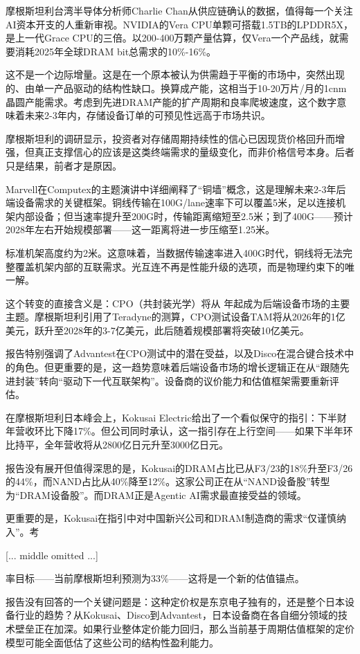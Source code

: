 \documentclass[11pt]{ctexart}
\begin{document}
摩根斯坦利台湾半导体分析师Charlie Chan从供应链确认的数据，值得每一个关注AI资本开支的人重新审视。NVIDIA的Vera CPU单颗可搭载1.5TB的LPDDR5X，是上一代Grace CPU的三倍。以200-400万颗产量估算，仅Vera一个产品线，就需要消耗2025年全球DRAM bit总需求的10\%-16\%。

这不是一个边际增量。这是在一个原本被认为供需趋于平衡的市场中，突然出现的、由单一产品驱动的结构性缺口。换算成产能，这相当于10-20万片/月的1cnm晶圆产能需求。考虑到先进DRAM产能的扩产周期和良率爬坡速度，这个数字意味着未来2-3年内，存储设备订单的可预见性远高于市场共识。

摩根斯坦利的调研显示，投资者对存储周期持续性的信心已因现货价格回升而增强，但真正支撑信心的应该是这类终端需求的量级变化，而非价格信号本身。后者只是结果，前者才是原因。

Marvell在Computex的主题演讲中详细阐释了“铜墙”概念，这是理解未来2-3年后端设备需求的关键框架。铜线传输在100G/lane速率下可以覆盖5米，足以连接机架内部设备；但当速率提升至200G时，传输距离缩短至2.5米；到了400G——预计2028年左右开始规模部署——这一距离将进一步压缩至1.25米。

标准机架高度约为2米。这意味着，当数据传输速率进入400G时代，铜线将无法完整覆盖机架内部的互联需求。光互连不再是性能升级的选项，而是物理约束下的唯一解。

这个转变的直接含义是：CPO（共封装光学）将从 年起成为后端设备市场的主要主题。摩根斯坦利引用了Teradyne的测算，CPO测试设备TAM将从2026年的1亿美元，跃升至2028年的3-7亿美元，此后随着规模部署将突破10亿美元。

报告特别强调了Advantest在CPO测试中的潜在受益，以及Disco在混合键合技术中的角色。但更重要的是，这一趋势意味着后端设备市场的增长逻辑正在从“跟随先进封装”转向“驱动下一代互联架构”。设备商的议价能力和估值框架需要重新评估。

在摩根斯坦利日本峰会上，Kokusai Electric给出了一个看似保守的指引：下半财年营收环比下降17\%。但公司同时承认，这一指引存在上行空间——如果下半年环比持平，全年营收将从2800亿日元升至3000亿日元。

报告没有展开但值得深思的是，Kokusai的DRAM占比已从F3/23的18\%升至F3/26的44\%，而NAND占比从40\%降至12\%。这家公司正在从“NAND设备股”转型为“DRAM设备股”。而DRAM正是Agentic AI需求最直接受益的领域。

更重要的是，Kokusai在指引中对中国新兴公司和DRAM制造商的需求“仅谨慎纳入”。考

[... middle omitted ...]

率目标——当前摩根斯坦利预测为33\%——这将是一个新的估值锚点。

报告没有回答的一个关键问题是：这种定价权是东京电子独有的，还是整个日本设备行业的趋势？从Kokusai、Disco到Advantest，日本设备商在各自细分领域的技术壁垒正在加深。如果行业整体定价能力回归，那么当前基于周期估值框架的定价模型可能全面低估了这些公司的结构性盈利能力。
\end{document}
